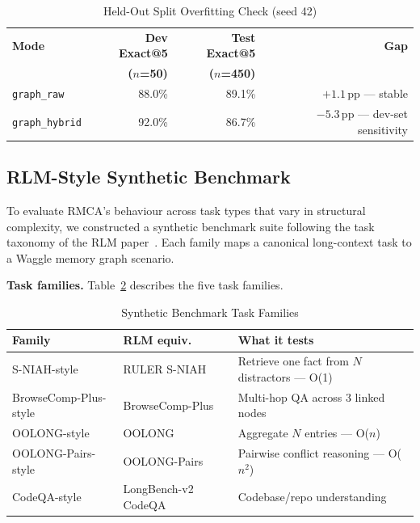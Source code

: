 \documentclass[conference]{IEEEtran}
\begin{document}
\begin{table}[htbp]
\caption{Held-Out Split Overfitting Check (seed 42)}
\label{tab:heldout}
\centering
\begin{tabular}{lrrr}
\toprule
\textbf{Mode} & \textbf{Dev Exact@5} & \textbf{Test Exact@5} & \textbf{Gap} \\
              & \textbf{($n$=50)}    & \textbf{($n$=450)}    & \\
\midrule
\texttt{graph\_raw}    & 88.0\% & 89.1\% & $+1.1$\,pp --- stable \\
\texttt{graph\_hybrid} & 92.0\% & 86.7\% & $-5.3$\,pp --- dev-set sensitivity \\
\bottomrule
\end{tabular}
\end{table}

\subsection{RLM-Style Synthetic Benchmark}

To evaluate RMCA's behaviour across task types that vary in structural complexity, we
constructed a synthetic benchmark suite following the task taxonomy of the RLM
paper~\cite{zhang2026rlm}. Each family maps a canonical long-context task to a Waggle
memory graph scenario.

\textbf{Task families.} Table~\ref{tab:families} describes the five task families.

\begin{table}[htbp]
\caption{Synthetic Benchmark Task Families}
\label{tab:families}
\centering
\begin{tabular}{p{2.0cm}p{1.8cm}p{3.2cm}}
\toprule
\textbf{Family} & \textbf{RLM equiv.} & \textbf{What it tests} \\
\midrule
S-NIAH-style & RULER S-NIAH~\cite{hsieh2024ruler} & Retrieve one fact from $N$ distractors --- O(1) \\
BrowseComp-Plus-style & BrowseComp-Plus & Multi-hop QA across 3 linked nodes \\
OOLONG-style & OOLONG~\cite{bertsch2025oolong} & Aggregate $N$ entries --- O($n$) \\
OOLONG-Pairs-style & OOLONG-Pairs & Pairwise conflict reasoning --- O($n^2$) \\
CodeQA-style & LongBench-v2 CodeQA~\cite{bai2025longbench} & Codebase/repo understanding \\
\bottomrule
\end{tabular}
\end{table}
\end{document}
